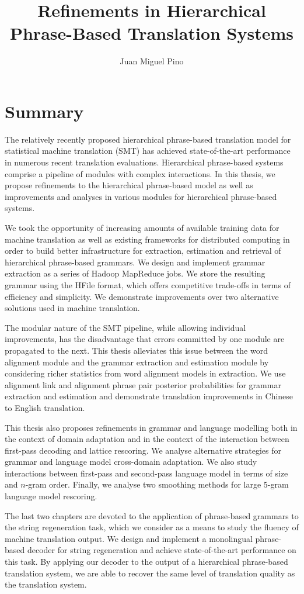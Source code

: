 \documentclass[oneside, 12pt]{article}
\title{Refinements in Hierarchical Phrase-Based Translation Systems}
\author{Juan Miguel Pino}
\date{}
\begin{document}
\maketitle

\vspace{-2.5cm}

\section*{Summary}

The relatively recently proposed hierarchical phrase-based
translation model for statistical machine translation (SMT)
has achieved state-of-the-art performance
in numerous recent translation evaluations. Hierarchical phrase-based
systems comprise a pipeline of modules with complex interactions.
In this thesis, we propose refinements to the hierarchical
phrase-based model as well as improvements and analyses in various
modules for hierarchical phrase-based systems.

We took the opportunity of increasing amounts of available training
data for machine translation as well as existing frameworks for
distributed computing in order to build better infrastructure
for extraction, estimation and retrieval of hierarchical phrase-based
grammars. We design and implement grammar extraction as a series of
Hadoop MapReduce jobs. We store the resulting grammar using the HFile
format, which
offers competitive trade-offs in terms of efficiency and simplicity.
We demonstrate improvements over two alternative solutions used in
machine translation.

The modular nature of the SMT pipeline, while allowing individual
improvements, has the disadvantage that errors committed by
one module are propagated to the next. This thesis
alleviates this issue between the word alignment module and the
grammar extraction and estimation module by considering richer
statistics from word alignment models in extraction. We use
alignment link and alignment phrase pair posterior probabilities
for grammar extraction and estimation and demonstrate translation
improvements in Chinese to English translation.

This thesis also proposes refinements in grammar and language
modelling both in the context of domain adaptation and in the
context of the interaction between first-pass decoding and
lattice rescoring. We analyse alternative strategies for grammar
and language model cross-domain adaptation. We also
study interactions between first-pass and second-pass language
model in terms of size and $n$-gram order. Finally, we
analyse two smoothing methods for large 5-gram language model
rescoring.

The last two chapters are devoted to the application of
phrase-based grammars to the string regeneration task, which
we consider as a means to study
the fluency of machine translation output.
We design and implement a monolingual phrase-based decoder
for string regeneration and achieve state-of-the-art
performance on this task. By applying our decoder
to the output of a hierarchical phrase-based translation system, we
are able to recover the same level of translation quality as
the translation system.
\end{document}
